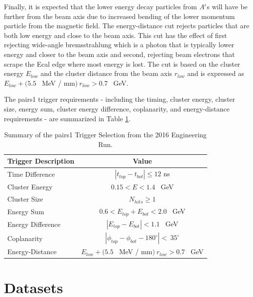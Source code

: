 Finally, it is expected that the lower energy decay particles from $A^\prime$s will have be further from the beam axis due to increased bending of the lower momentum particle from the magnetic field. The energy-distance cut rejects particles that are both low energy and close to the beam axis. This cut has the effect of first rejecting wide-angle bremsstrahlung which is a photon that is typically lower energy and closer to the beam axis and second, rejecting beam electrons that scrape the Ecal edge where most energy is lost. The cut is based on the cluster energy $E_{low}$ and the cluster distance from the beam axis $r_{low}$ and is expressed as $E_{low} + (5.5$ \ MeV / mm$) \ r_{low} > 0.7$ \ GeV.

The pairs1 trigger requirements - including the timing, cluster energy, cluster size, energy sum, cluster energy difference, coplanarity, and energy-distance requirements - are summarized in Table \ref{tab:trigger}.


\begin{table}[!hb] 
    \centering
    \begin{tabular}{lc}
        \toprule
        \textbf{Trigger Description} & \textbf{Value} \\
        \midrule
        \midrule
            Time Difference & $|t_{top} - t_{bot}| \leq 12$ ns \\
            Cluster Energy & $0.15 < E < 1.4$ \ GeV  \\
            Cluster Size & $N_{hits} \ge 1$ \\
            Energy Sum & $0.6 < E_{top} + E_{bot}< 2.0$ \ GeV \\
            Energy Difference & $|E_{top} - E_{bot}| < 1.1$ \ GeV \\
            Coplanarity & $|\phi_{top} - \phi_{bot} - 180^{\circ}| < \ 35^{\circ}$ \\
            Energy-Distance & $E_{low} + (5.5$ \ MeV / mm$) \ r_{low} > 0.7$ \ GeV \\
        \bottomrule
    \end{tabular}
    \caption{Summary of the pairs1 Trigger Selection from the 2016 Engineering Run.}
    \label{tab:trigger}
\end{table}

\clearpage

\section{Datasets}\label{sec:datasets}

